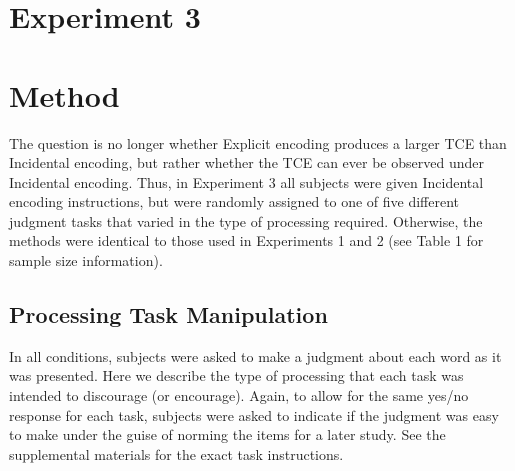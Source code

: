 \documentclass[jou,natbib]{apa6} %
\begin{document}









\section{Experiment 3}
\section{Method}
The question is no longer whether Explicit encoding produces a larger TCE than Incidental encoding, but rather whether the TCE can ever be observed under Incidental encoding. Thus, in Experiment 3 all subjects were given Incidental encoding instructions, but were randomly assigned to one of five different judgment tasks that varied in the type of processing required. Otherwise, the methods were identical to those used in Experiments 1 and 2 (see Table 1 for sample size information).

\subsection{Processing Task Manipulation}
In all conditions, subjects were asked to make a judgment about each word as it was presented. Here we describe the type of processing that each task was intended to discourage (or encourage). Again, to allow for the same yes/no response for each task, subjects were asked to indicate if the judgment was easy to make under the guise of norming the items for a later study. See the supplemental materials for the exact task instructions.
\end{document}
